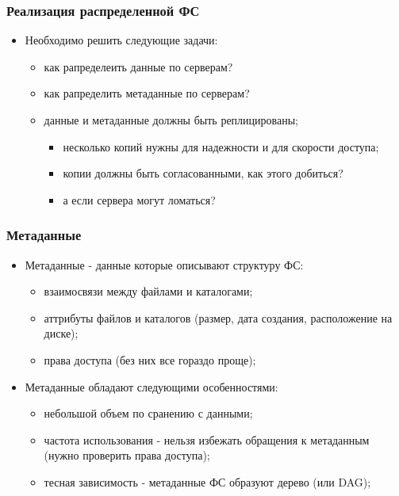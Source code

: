 \begin{frame}
\frametitle{Реализация распределенной ФС}
\begin{itemize}
  \item<1-> Необходимо решить следующие задачи:
    \begin{itemize}
      \item как рапределеить данные по серверам?
      \item как рапределить метаданные по серверам?
      \item данные и метаданные должны быть реплицированы;
        \begin{itemize}
          \item несколько копий нужны для надежности и для скорости доступа;
          \item копии должны быть согласованными, как этого добиться?
          \item<2-> а если сервера могут ломаться?
        \end{itemize}
    \end{itemize}
\end{itemize}
\end{frame}

\begin{frame}
\frametitle{Метаданные}
\begin{itemize}
  \item<1-> Метаданные - данные которые описывают структуру ФС:
    \begin{itemize}
      \item взаимосвязи между файлами и каталогами;
      \item аттрибуты файлов и каталогов (размер, дата создания, расположение на диске);
      \item права доступа (без них все гораздо проще);
    \end{itemize}
  \item<2-> Метаданные обладают следующими особенностями:
    \begin{itemize}
      \item небольшой объем по сранению с данными;
      \item частота использования - нельзя избежать обращения к метаданным (нужно проверить права доступа);
      \item тесная зависимость - метаданные ФС образуют дерево (или DAG);
    \end{itemize}
\end{itemize}
\end{frame}

